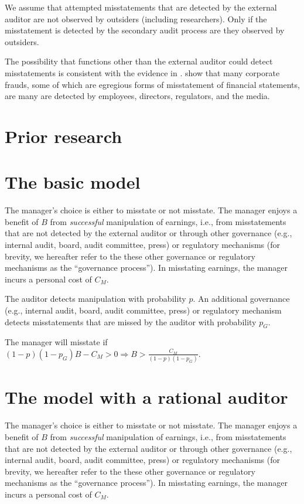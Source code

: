 \documentclass[11pt]{amsart}
\begin{document}
We assume that attempted misstatements that are detected by the external auditor are not observed by outsiders (including researchers). Only if the misstatement is detected by the secondary audit process are they observed by outsiders.

The possibility that functions other than the external auditor could detect misstatements is consistent with the evidence in \citet{Dyck:2010kh}. \citet{Dyck:2010kh} show that many corporate frauds, some of which are egregious forms of misstatement of financial statements, are many are detected by employees, directors, regulators, and the media.

\section{Prior research}

\section{The basic model}
The manager's choice is either to misstate or not misstate. The manager enjoys a benefit of $B$ from \emph{successful} manipulation of earnings, i.e., from misstatements that are not detected by the external auditor or through other governance (e.g., internal audit, board, audit committee, press) or regulatory mechanisms (for brevity, we hereafter refer to the these other governance or regulatory mechanisms as the ``governance process''). In misstating earnings, the manager incurs a personal cost of $C_M$.

The auditor detects manipulation with probability $p$. An additional governance (e.g., internal audit, board, audit committee, press) or regulatory mechanism detects misstatements that are missed by the auditor with probability $p_G$. 

The manager will misstate if $(1 - p)(1 - p_G) B - C_M > 0 \Rightarrow  B > \frac{C_M}{(1 - p)(1 - p_G)}$.

\section{The model with a rational auditor}

The manager's choice is either to misstate or not misstate. The manager enjoys a benefit of $B$ from \emph{successful} manipulation of earnings, i.e., from misstatements that are not detected by the external auditor or through other governance (e.g., internal audit, board, audit committee, press) or regulatory mechanisms (for brevity, we hereafter refer to the these other governance or regulatory mechanisms as the ``governance process''). In misstating earnings, the manager incurs a personal cost of $C_M$.
\end{document}
